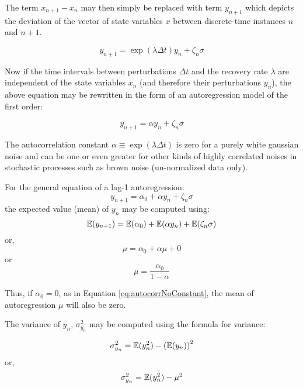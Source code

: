 The term $x_{n+1} - x_{n}$ may then simply be replaced with term $y_{n+1}$ which depicts the deviation of the vector of state variables $x$ between discrete-time instances $n$ and $n+1$.

\begin{equation}
	y_{n+1} = \exp{(\lambda \Delta t)}y_n + \zeta_n
	\sigma
\end{equation}

Now if the time intervals between perturbations $\Delta t$ and the recovery rate $\lambda$ are independent of the state variables $x_{n}$ (and therefore their perturbations $y_{n}$), the above equation may be rewritten in the form of an autoregression model of the first order:

\begin{equation}
	\label{eq:autocorrNoConstant}
	y_{n+1} = \alpha y_{n} + \zeta_n\sigma
\end{equation}

The autocorrelation constant $\alpha \equiv \exp{(\lambda \Delta t)}$ is zero for a purely white gaussian noise and can be one or even greater for other kinds of highly correlated noises in stochastic processes such as brown noise (un-normalized data only).

For the general equation of a lag-1 autoregression:
\begin{equation}
	\label{eq:autocorrGeneral}
	y_{n+1} = \alpha_0 + \alpha y_{n} + \zeta_n\sigma
\end{equation} 
the expected value (mean) of $y_{n}$ may be computed using:
\begin{equation}
	\EX(y_{n+1}) = \EX(\alpha_0) + \EX(\alpha y_{n}) + \EX(\zeta_n \sigma)
\end{equation}
\hspace{25pt} or,
\begin{equation}
	\mu = \alpha_0 + \alpha\mu + 0
\end{equation}
\hspace{25pt} or
\begin{equation}
	\label{eq:meanFormulaGeneral}
	\mu = \frac{\alpha_0}{1-\alpha}
\end{equation}

Thus, if $\alpha_0 = 0$, as in Equation \ref{eq:autocorrNoConstant}, the mean of autoregression $\mu$ will also be zero.

The variance of $y_{n}$, $\sigma^2_{y_{n}}$ may be computed using the formula for variance:

\begin{equation}
	\sigma^2_{y_{n}} = \EX(y^2_{n}) - \left(\EX(y_{n})\right)^2
\end{equation} 	
\hspace{25pt} or,
\begin{equation}
	\label{eq:sigmaComputationBegins}
	\sigma^2_{y_{n}} = \EX(y^2_{n}) - \mu^2
\end{equation}

